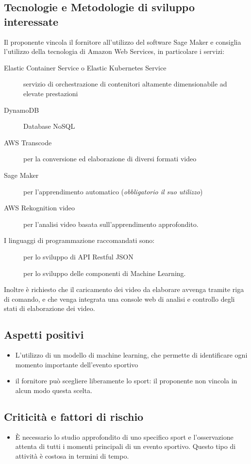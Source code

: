 \documentclass[../studio-di-fattibilita.tex]{subfiles}
\begin{document}
\subsection{Tecnologie e Metodologie di sviluppo interessate}%
\label{subsec:tecnologie_interessate}
Il proponente vincola il fornitore all'utilizzo del software Sage Maker e consiglia l'utilizzo della tecnologia di Amazon Web Services, in particolare i servizi:
\begin{description}
  \item[Elastic Container Service o Elastic Kubernetes Service] servizio di orchestrazione di contenitori altamente dimensionabile ad elevate prestazioni
  \item[DynamoDB] Database NoSQL
  \item[AWS Transcode] per la conversione ed elaborazione di diversi formati video
  \item[Sage Maker] per l'apprendimento automatico (\textit{obbligatorio il suo utilizzo})
  \item[AWS Rekognition video] per l'analisi video basata sull'apprendimento approfondito.
\end{description}
I linguaggi di programmazione raccomandati sono:
\begin{description}
  \item[] per lo sviluppo di API Restful JSON
  \item[] per lo sviluppo delle componenti di Machine Learning.
\end{description}
Inoltre è richiesto che il caricamento dei video da elaborare avvenga tramite riga di comando, e che venga integrata una console web di analisi e controllo degli stati di elaborazione dei video.


\subsection{Aspetti positivi}%
\label{subsec:aspetti_positivi}
\begin{itemize}
  \item L'utilizzo di un modello di machine learning, che permette di identificare ogni momento importante dell'evento sportivo
  \item il fornitore può scegliere liberamente lo sport: il proponente non vincola in alcun modo questa scelta.
\end{itemize}


\subsection{Criticità e fattori di rischio}%
\label{sec:criticita_e_fattori_di_rischio}
\begin{itemize}
  \item È necessario lo studio approfondito di uno specifico sport e l'osservazione attenta di tutti i momenti principali di un evento sportivo. Questo tipo di attività è costosa in termini di tempo.
\end{itemize}
\end{document}
